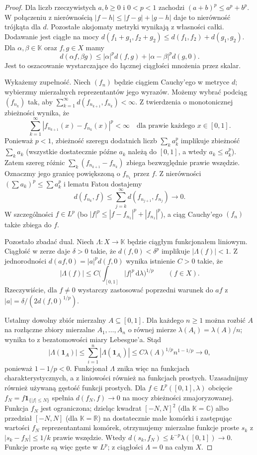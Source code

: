 \documentclass[11pt,a4paper]{article}
\numberwithin{equation}{section}
\theoremstyle{plain}
\theoremstyle{definition}
\theoremstyle{remark}
\newcommand{\R}{\mathbb R}
\newcommand{\C}{\mathbb C}
\newcommand{\K}{\mathbb K}
\begin{document}
\begin{proof}
Dla liczb rzeczywistych $a,b\geq0$ i $0<p<1$ zachodzi
$(a+b)^p\leq a^p+b^p$. W połączeniu z nierównością
$|f-h|\leq|f-g|+|g-h|$ daje to nierówność trójkąta dla $d$.
Pozostałe aksjomaty metryki wynikają z własności całki.
Dodawanie jest ciągłe na mocy
$d(f_1+g_1,f_2+g_2)\leq d(f_1,f_2)+d(g_1,g_2)$.
Dla $\alpha,\beta\in\K$ oraz $f,g\in X$ mamy
\[
 d(\alpha f,\beta g)
 \leq |\alpha|^p d(f,g)+|\alpha-\beta|^p d(g,0).
\]
Jest to oszacowanie wystarczające do łącznej ciągłości
mnożenia przez skalar.

Wykażemy zupełność. Niech $(f_n)$ będzie ciągiem Cauchy'ego
w metryce $d$; wybierzmy mierzalnych reprezentantów jego wyrazów.
Możemy wybrać podciąg $(f_{n_k})$ tak, aby
$\sum_{k=1}^\infty d(f_{n_{k+1}},f_{n_k})<\infty$.
Z twierdzenia o monotonicznej zbieżności wynika, że
\[
 \sum_{k=1}^\infty|f_{n_{k+1}}(x)-f_{n_k}(x)|^p<\infty
 \quad\text{dla prawie każdego }x\in[0,1].
\]
Ponieważ $p<1$, zbieżność szeregu dodatnich liczb
$\sum_k a_k^p$ implikuje zbieżność $\sum_k a_k$
(wszystkie dostatecznie późne $a_k$ należą do $[0,1]$,
a wtedy $a_k\leq a_k^p$). Zatem szereg różnic
$\sum_k(f_{n_{k+1}}-f_{n_k})$ zbiega bezwzględnie
prawie wszędzie. Oznaczmy jego granicę powiększoną o
$f_{n_1}$ przez $f$. Z nierówności $(\sum a_k)^p\leq\sum a_k^p$
i lematu Fatou dostajemy
\[
 d(f_{n_k},f)
 \leq \sum_{j=k}^\infty d(f_{n_{j+1}},f_{n_j})\longrightarrow0.
\]
W szczególności $f\in L^p$ (bo $|f|^p\leq|f-f_{n_1}|^p+|f_{n_1}|^p$),
a ciąg Cauchy'ego $(f_n)$ także zbiega do $f$.

Pozostało zbadać dual. Niech $\Lambda\colon X\to\K$
będzie ciągłym funkcjonałem liniowym. Ciągłość w zerze
daje $\delta>0$ takie, że
$d(f,0)<\delta^p$ implikuje $|\Lambda(f)|<1$.
Z jednorodności $d(af,0)=|a|^p d(f,0)$ wynika istnienie
$C>0$ takie, że
\[
 |\Lambda(f)|\leq C\Big(\int_{[0,1]}|f|^p\,\mathrm d\lambda\Big)^{1/p}
 \qquad(f\in X).
\]
Rzeczywiście, dla $f\ne0$ wystarczy zastosować poprzedni
warunek do $a f$ z $|a|=\delta/(2d(f,0)^{1/p})$.

Ustalmy dowolny zbiór mierzalny $A\subseteq[0,1]$.
Dla każdego $n\geq1$ można rozbić $A$ na rozłączne
zbiory mierzalne $A_1,\ldots,A_n$ o równej mierze
$\lambda(A_i)=\lambda(A)/n$; wynika to z bezatomowości
miary Lebesgue'a. Stąd
\[
 |\Lambda(\mathbf1_A)|
 \leq\sum_{i=1}^n|\Lambda(\mathbf1_{A_i})|
 \leq C\lambda(A)^{1/p}n^{1-1/p}\longrightarrow0,
\]
ponieważ $1-1/p<0$. Funkcjonał $\Lambda$ znika więc
na funkcjach charakterystycznych, a z liniowości również
na funkcjach prostych. Uzasadnijmy również używaną gęstość funkcji prostych.
Dla $f\in L^p([0,1],\lambda)$ obcięcie
$f_N=f\mathbf1_{\{|f|\leq N\}}$ spełnia
$d(f_N,f)\to0$ na mocy zbieżności zmajoryzowanej.
Funkcja $f_N$ jest ograniczona; dzieląc kwadrat
$[-N,N]^2$ (dla $\K=\C$) albo przedział $[-N,N]$
(dla $\K=\R$) na dostatecznie małe komórki i zastępując
wartości $f_N$ reprezentantami komórek, otrzymujemy
mierzalne funkcje proste $s_k$ z
$|s_k-f_N|\leq1/k$ prawie wszędzie. Wtedy
$d(s_k,f_N)\leq k^{-p}\lambda([0,1])\to0$.
Funkcje proste są więc gęste w $L^p$; z ciągłości
$\Lambda=0$ na całym $X$.
\end{proof}
\end{document}
